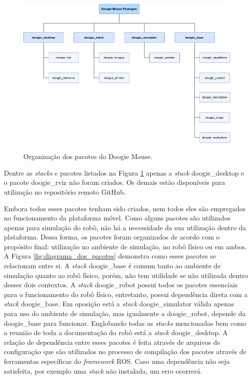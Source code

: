 \begin{figure}[H]
	\centering
	\caption{Organização dos pacotes do Doogie Mouse.}
	\includegraphics[width=1\textwidth]
	{Figures/doogie_packages}
	\label{fig:doogie_packages}
\end{figure}

Dentre as \textit{stacks} e pacotes listados na Figura \ref{fig:doogie_packages} apenas a \textit{stack} doogie\_desktop e o pacote doogie\_rviz não foram criados. Os demais estão disponíveis para utilização no repositório remoto GitHub.

Embora todos esses pacotes tenham sido criados, nem todos eles são empregados no funcionamento da plataforma móvel. Como alguns pacotes são utilizados apenas para simulação do robô, não há a necessidade da sua utilização dentro da plataforma. Dessa forma, os pacotes foram organizados de acordo com o propósito final: utilização no ambiente de simulação, no robô físico ou em ambos. A Figura \ref{fig:diagrama_dos_pacotes} demonstra como esses pacotes se relacionam entre si. A \textit{stack} doogie\_base é comum tanto ao ambiente de simulação quanto ao robô físico, porém, não tem utilidade se não utilizada dentro desses dois contextos. A \textit{stack} doogie\_robot possui todos os pacotes essenciais para o funcionamento do robô físico, entretanto, possui dependência direta com a \textit{stack} doogie\_base. Em oposição está a \textit{stack} doogie\_simulator válida apenas para uso do ambiente de simulação, mas igualmente a doogie\_robot, depende da doogie\_base para funcionar. Englobando todas as \textit{stacks} mencionadas bem como a reunião de toda a documentação do robô está a \textit{stack} doogie\_desktop. A relação de dependência entre esses pacotes é feita através de arquivos de configuração que são utilizados no processo de compilação dos pacotes através de ferramentas específicas do \textit{framework} ROS. Caso uma dependência não seja satisfeita, por exemplo uma \textit{stack} não instalada, um erro ocorrerá.   

